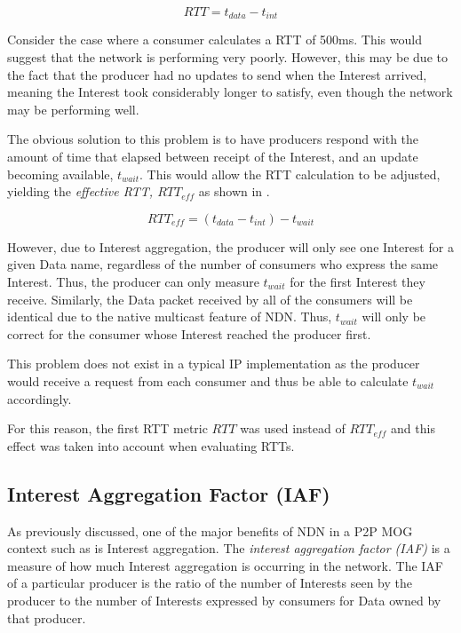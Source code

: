 \begin{equation}\label{eq:impl:rtt}
    RTT = t_{data} - t_{int}
\end{equation}

Consider the case where a consumer calculates a RTT of 500ms. This would suggest that the network is performing very poorly. However, this may be due to the fact that the producer had no updates to send when the Interest arrived,  meaning the Interest took considerably longer to satisfy, even though the network may be performing well.

The obvious solution to this problem is to have producers respond with the amount of time that elapsed between receipt of the Interest, and an update becoming available, $t_{wait}$. This would allow the RTT calculation to be adjusted, yielding the \textit{effective RTT, $RTT_{eff}$} as shown in .

\begin{equation}\label{eq:impl:rtt-eff}
    RTT_{eff} = (t_{data} - t_{int}) - t_{wait}
\end{equation}

However, due to Interest aggregation, the producer will only see one Interest for a given Data name, regardless of the number of consumers who express the same Interest. Thus, the producer can only measure $t_{wait}$ for the first Interest they receive. Similarly, the Data packet received by all of the consumers will be identical due to the native multicast feature of NDN. Thus, $t_{wait}$ will only be correct for the consumer whose Interest reached the producer first.

This problem does not exist in a typical IP implementation as the producer would receive a request from each consumer and thus be able to calculate $t_{wait}$ accordingly.

For this reason, the first RTT metric $RTT$ was used instead of $RTT_{eff}$ and this effect was taken into account when evaluating RTTs.


\subsection{Interest Aggregation Factor (IAF)}
As previously discussed, one of the major benefits of NDN in a P2P MOG context such as \game{} is Interest aggregation. The \textit{interest aggregation factor (IAF)} is a measure of how much Interest aggregation is occurring in the network. The IAF of a particular producer is the ratio of the number of Interests seen by the producer to the number of Interests expressed by consumers for Data owned by that producer.

